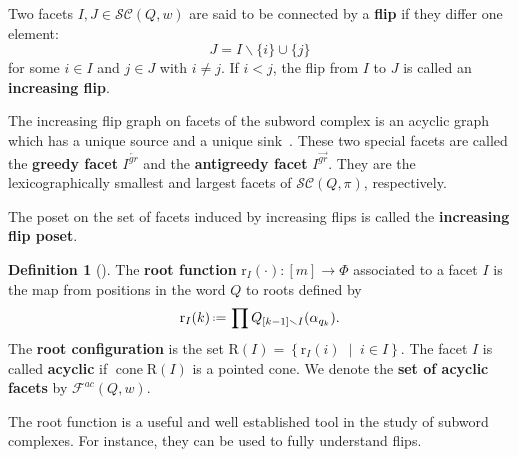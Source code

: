 \documentclass{amsart}
\theoremstyle{definition}
\newtheorem{definition}[theorem]{Definition}
\newcommand{\set}[2]{\left\{ #1 \;\middle|\; #2 \right\}} %
\newcommand{\eqdef}{\mbox{\,\raisebox{0.2ex}{\scriptsize\ensuremath{\mathrm:}}\ensuremath{=}\,}} %
\DeclareMathOperator{\cone}{cone} %
\newcommand{\defn}[1]{\textbf{\textsf{\color{PineGreen} #1}}} %
\newcommand{\subwordComplex}{\mathcal{SC}} %
\newcommand{\Roots}{\mathrm{R}} %
\newcommand{\rootFunction}[2]{\mathrm{r}_{#1}(#2)} %
\newcommand{\subwordAcyclicFacets}{\mathcal{F}^{ac}} %
\newcommand{\greedyFacet}{I^{\overleftarrow{gr}}} %
\newcommand{\antiGreedyFacet}{I^{\overrightarrow{gr}}} %
\begin{document}
Two facets $I,J\in\subwordComplex(Q,w)$ are said to be connected by a \defn{flip} if they differ one element:
\[J=I\smallsetminus \{i\} \cup\{j\}\]
for some $i\in I$ and $j\in J$ with $i\neq j$.
If $i<j$, the flip from $I$ to $J$ is called an \defn{increasing flip}.

The increasing flip graph on facets of the subword complex is an acyclic graph which has a unique source and a unique sink~\cite{Pilaud-greedyFlipTree, PilaudStump-ELlabelings}.
These two special facets are called the \defn{greedy facet} $\greedyFacet$ and the \defn{antigreedy facet} $\antiGreedyFacet$.
They are the lexicographically smallest and largest facets of $\subwordComplex(Q,\pi)$, respectively.

The poset on the set of facets induced by increasing flips is called the \defn{increasing flip poset}.

\begin{definition}[{\cite{CeballosLabbeStump}}]
    The \defn{root function} $\rootFunction{I}{\cdot}:[m]\rightarrow \Phi$ associated to a facet $I$ is the map from positions in the word $Q$ to roots defined by 
    \[
    \rootFunction{I}{k} \eqdef \prod Q_{[k-1]\smallsetminus I}(\alpha_{q_k}).
    \]
    The \defn{root configuration} is the set $\Roots(I)=\set{\rootFunction{I}{i}}{i\in I}$.
    The facet $I$ is called \defn{acyclic} if $\cone \Roots(I)$ is a pointed cone.
    We denote the \defn{set of acyclic facets} by $\subwordAcyclicFacets(Q,w)$.
\end{definition}

The root function is a useful and well established tool in the study of subword complexes.
For instance, they can be used to fully understand flips.
\end{document}
